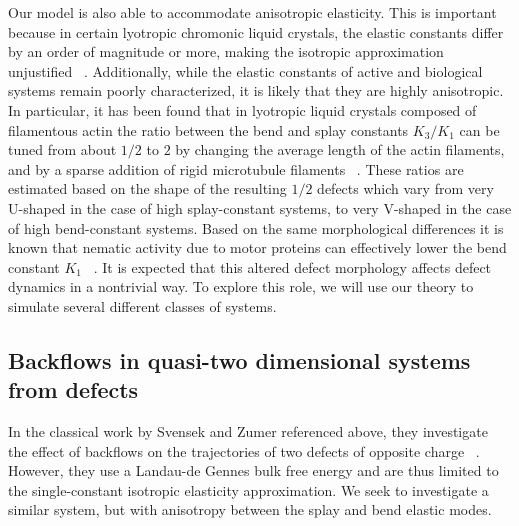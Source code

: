\documentclass[reqno]{article}
\begin{document}
  Our model is also able to accommodate anisotropic elasticity.
  This is important because in certain lyotropic chromonic liquid crystals, the
  elastic constants differ by an order of magnitude or more, making the
  isotropic approximation unjustified ~\cite{zhou_elasticity_2012}.
  Additionally, while the elastic constants of active and biological systems
  remain poorly characterized, it is likely that they are highly anisotropic.
  In particular, it has been found that in lyotropic liquid crystals composed of
  filamentous actin the ratio between the bend and splay constants $K_3/K_1$ can
  be tuned from about $1/2$ to $2$ by changing the average length of the actin
  filaments, and by a sparse addition of rigid microtubule filaments
  ~\cite{zhang_interplay_2018}.
  These ratios are estimated based on the shape of the resulting $1/2$ defects
  which vary from very U-shaped in the case of high splay-constant systems, to very
  V-shaped in the case of high bend-constant systems.
  Based on the same morphological differences it is known that nematic activity
  due to motor proteins can effectively lower the bend constant $K_1$ ~\cite{kumar_tunable_2018}.
  It is expected that this altered defect morphology affects defect dynamics in
  a nontrivial way.
  To explore this role, we will use our theory to simulate several different
  classes of systems.
  
  \subsection{Backflows in quasi-two dimensional systems from defects}
  In the classical work by Svensek and Zumer referenced above, they investigate
  the effect of backflows on the trajectories of two defects of opposite charge ~\cite{svensek_hydrodynamics_2002}.
  However, they use a Landau-de Gennes bulk free energy and are thus limited to
  the single-constant isotropic elasticity approximation.
  We seek to investigate a similar system, but with anisotropy between the splay and
  bend elastic modes.
  
\end{document}
